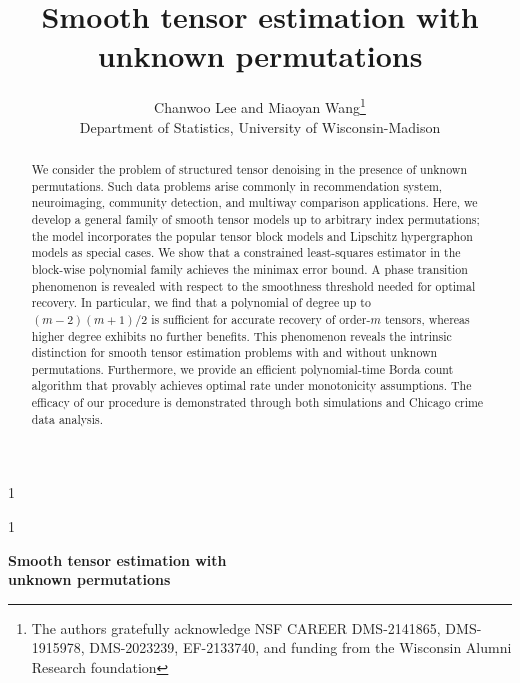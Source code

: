\documentclass[12pt]{article}
\newcommand{\blind}{1}
\theoremstyle{definition}
\begin{document}
\def\spacingset#1{\renewcommand{\baselinestretch}%
{#1}\small\normalsize} \spacingset{1}



\blind
{
  \title{\bf Smooth tensor estimation with \\ unknown permutations}
  \author{Chanwoo Lee and Miaoyan Wang\thanks{
    The authors gratefully acknowledge NSF CAREER DMS-2141865, DMS-1915978, DMS-2023239, EF-2133740, and funding from the Wisconsin Alumni Research foundation}\hspace{.2cm}\\
    Department of Statistics, University of Wisconsin-Madison}
  \date{}
  \maketitle
} \fi

\blind
{
  \bigskip
  \bigskip
  \bigskip
  \begin{center}
    {\LARGE\bf Smooth tensor estimation with \\ unknown permutations}
\end{center}
  \medskip
} \fi

\bigskip

\begin{abstract}%
 We consider the problem of structured tensor denoising in the presence of unknown permutations. Such data problems arise commonly in recommendation system, neuroimaging, community detection, and multiway comparison applications. Here, we develop a general family of smooth tensor models up to arbitrary index permutations; the model incorporates the popular tensor block models and Lipschitz hypergraphon models as special cases. We show that a constrained least-squares estimator in the block-wise polynomial family achieves the minimax error bound. A phase transition phenomenon is revealed with respect to the smoothness threshold needed for optimal recovery. In particular, we find that a polynomial of degree up to {\footnotesize $(m-2)(m+1)/2$} is sufficient for accurate recovery of order-$m$ tensors, whereas higher degree exhibits no further benefits. This phenomenon reveals the intrinsic distinction for smooth tensor estimation problems with and without unknown permutations. Furthermore, we provide an efficient polynomial-time Borda count algorithm that provably achieves optimal rate under monotonicity assumptions. The efficacy of our procedure is demonstrated through both simulations and Chicago crime data analysis. 
  \end{abstract}
\end{document}
